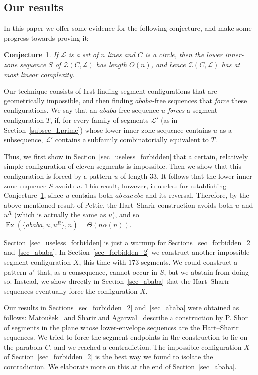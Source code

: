 \documentclass[11pt]{article}
\DeclareMathOperator{\Ex}{Ex}
\newtheorem{conjecture}[theorem]{Conjecture}
\theoremstyle{definition}
\theoremstyle{remark}
\begin{document}
\subsection{Our results}\label{subsec_our_results}

In this paper we offer some evidence for the following conjecture, and make some progress towards proving it:

\begin{conjecture}\label{conj}
If $\mathcal L$ is a set of $n$ lines and $C$ is a circle, then the lower inner-zone sequence $S$ of $\mathcal Z(C, \mathcal L)$ has length $O(n)$, and hence $\mathcal Z(C, \mathcal L)$ has at most linear complexity.
\end{conjecture}

Our technique consists of first finding segment configurations that are geometrically impossible, and then finding $ababa$-free sequences that \emph{force} these configurations. We say that an $ababa$-free sequence $u$ \emph{forces} a segment configuration $T$, if, for every family of segments $\mathcal L'$ (as in Section~\ref{subsec_Lprime}) whose lower inner-zone sequence contains $u$ as a subsequence, $\mathcal L'$ contains a subfamily combinatorially equivalent to $T$.

Thus, we first show in Section~\ref{sec_useless_forbidden} that a certain, relatively simple configuration of eleven segments is impossible. Then we show that this configuration is forced by a pattern $u$ of length $33$. It follows that the lower inner-zone sequence $S$ avoids $u$. This result, however, is useless for establishing Conjecture~\ref{conj}, since $u$ contains both $ab\,cac\,cbc$ and its reversal. Therefore, by the above-mentioned result of Pettie, the Hart--Sharir construction avoids both $u$ and $u^R$ (which is actually the same as $u$), and so $\Ex(\{ababa, u, u^R\}, n) = \Theta(n\alpha(n))$.

Section~\ref{sec_useless_forbidden} is just a warmup for Sections~\ref{sec_forbidden_2} and~\ref{sec_ababa}. In Section~\ref{sec_forbidden_2} we construct another impossible segment configuration $X$, this time with $173$ segments. We could construct a pattern $u'$ that, as a consequence, cannot occur in $S$, but we abstain from doing so. Instead, we show directly in Section~\ref{sec_ababa} that the Hart--Sharir sequences eventually force the configuration $X$.

Our results in Sections~\ref{sec_forbidden_2} and~\ref{sec_ababa} were obtained as follows: Matou\v sek~\cite{mat_DG} and Sharir and Agarwal~\cite{DS_book} describe a construction by P. Shor of segments in the plane whose lower-envelope sequences are the Hart--Sharir sequences. We tried to force the segment endpoints in the construction to lie on the parabola $C$, and we reached a contradiction. The impossible configuration $X$ of Section~\ref{sec_forbidden_2} is the best way we found to isolate the contradiction. We elaborate more on this at the end of Section~\ref{sec_ababa}.
\end{document}
